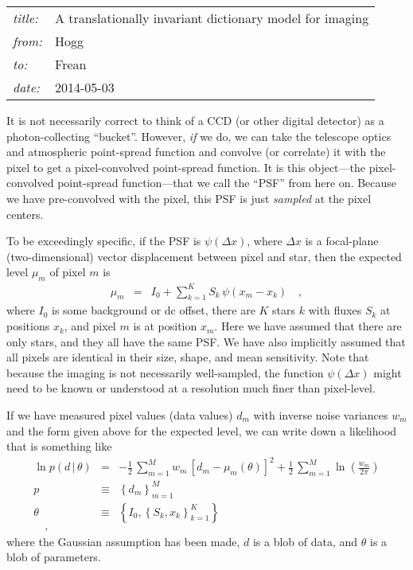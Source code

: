 \documentclass[12pt]{article}
\newcommand{\given}{\,|\,}
\begin{document}
\sloppy\sloppypar

\noindent
\begin{tabular}{ll}
\textsl{title:}   & A translationally invariant dictionary model for imaging  \\
\textsl{from:}    & Hogg \\
\textsl{to:}      & Frean \\
\textsl{date:}    & 2014-05-03
\end{tabular}
\bigskip

It is not necessarily correct to think of a CCD (or other digital
detector) as a photon-collecting ``bucket''.
However, \emph{if} we do, we can take the telescope optics and
atmospheric point-spread function and convolve (or correlate) it with
the pixel to get a pixel-convolved point-spread function.
It is this object---the pixel-convolved point-spread function---that
we call the ``PSF'' from here on.
Because we have pre-convolved with the pixel, this PSF is just
\emph{sampled} at the pixel centers.

To be exceedingly specific, if the PSF is $\psi(\Delta x)$, where
$\Delta x$ is a focal-plane (two-dimensional) vector displacement
between pixel and star, then the expected level $\mu_m$ of pixel $m$
is
\begin{eqnarray}
\mu_m &=& I_0 + \sum_{k=1}^K S_k\,\psi(x_m - x_k)
\quad ,
\end{eqnarray}
where $I_0$ is some background or dc offset, there are $K$ stars $k$
with fluxes $S_k$ at positions $x_k$, and pixel $m$ is at position
$x_m$.
Here we have assumed that there are only stars, and they all have the
same PSF.
We have also implicitly assumed that all pixels are identical in their
size, shape, and mean sensitivity.
Note that because the imaging is not necessarily well-sampled, the
function $\psi(\Delta x)$ might need to be known or understood at a
resolution much finer than pixel-level.

If we have measured pixel values (data values) $d_m$ with inverse
noise variances $w_m$ and the form given above for the expected level,
we can write down a likelihood that is something like
\begin{eqnarray}
\ln p(d\given\theta) &=& -\frac{1}{2}\,\sum_{m=1}^M w_m\,[d_m - \mu_m(\theta)]^2 + \frac{1}{2}\,\sum_{m=1}^M \ln(\frac{w_m}{2\pi})
\\
p &\equiv& \left\{d_m\right\}_{m=1}^M
\\
\theta &\equiv& \left\{I_0, \left\{S_k, x_k\right\}_{k=1}^K\right\}
\\
\quad,
\end{eqnarray}
where the Gaussian assumption has been made, $d$ is a blob of data,
and $\theta$ is a blob of parameters.
\end{document}

